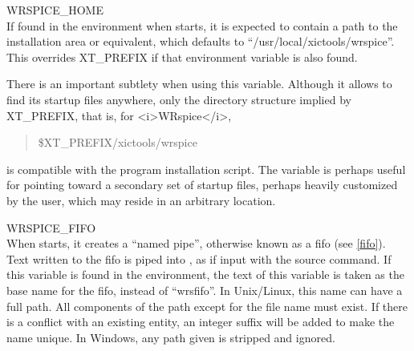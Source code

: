 \begin{description}
\item{\et WRSPICE\_HOME}\\
If found in the environment when {\WRspice} starts, it is expected to
contain a path to the {\WRspice} installation area or equivalent,
which defaults to ``{\vt /usr/local/xictools/wrspice}''.  This
overrides {\et XT\_PREFIX} if that environment variable is also found.

There is an important subtlety when using this variable.  Although it
allows {\WRspice} to find its startup files anywhere, only the
directory structure implied by {\et XT\_PREFIX}, that is, for
<i>WRspice</i>,
\begin{quote} \vt
\$XT\_PREFIX/xictools/wrspice
\end{quote}
is compatible with the program installation script.  The variable is
perhaps useful for pointing {\WRspice} toward a secondary set of
startup files, perhaps heavily customized by the user, which may
reside in an arbitrary location.

\item{\et WRSPICE\_FIFO}\\
When {\WRspice} starts, it creates a ``named pipe'', otherwise known
as a fifo (see \ref{fifo}).  Text written to the fifo is piped into
{\WRspice}, as if input with the {\cb source} command.  If this
variable is found in the environment, the text of this variable is
taken as the base name for the fifo, instead of ``{\vt wrsfifo}''.  In
Unix/Linux, this name can have a full path.  All components of the
path except for the file name must exist.  If there is a conflict with
an existing entity, an integer suffix will be added to make the name
unique.  In Windows, any path given is stripped and ignored.


\end{description}
